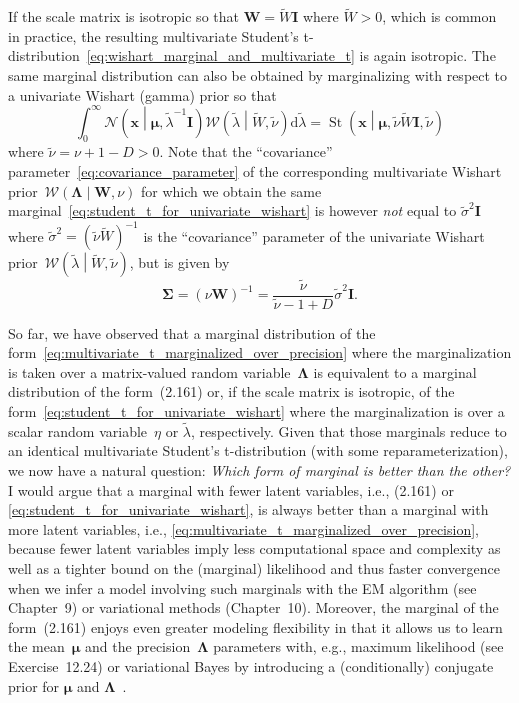 \documentclass[12pt,a4paper]{article}
\begin{document}
If the scale matrix is isotropic so that $\mathbf{W} = \widetilde{W}\mathbf{I}$ where
$\widetilde{W} > 0$,
which is common in practice,
the resulting multivariate Student's t-distribution~\eqref{eq:wishart_marginal_and_multivariate_t}
is again isotropic. The same marginal distribution can also be obtained by marginalizing
with respect to a univariate Wishart (gamma) prior so that
\begin{equation}
\int_{0}^{\infty}
\mathcal{N}\left(\mathbf{x}\middle|\bm{\mu}, \widetilde{\lambda}^{-1}\mathbf{I}\right)
\mathcal{W}\left(\widetilde{\lambda}\middle|\widetilde{W}, \widetilde{\nu}\right)
\mathrm{d}\widetilde{\lambda}
= \operatorname{St}\left(\mathbf{x} \middle|
\bm{\mu}, \widetilde{\nu} \widetilde{W} \mathbf{I}, \widetilde{\nu} \right)
\label{eq:student_t_for_univariate_wishart}
\end{equation}
where $\widetilde{\nu} = \nu + 1 - D > 0$.
Note that the ``covariance'' parameter~\eqref{eq:covariance_parameter} of
the corresponding multivariate
Wishart prior~$\mathcal{W}\left(\bm{\Lambda}\middle|\mathbf{W}, \nu\right)$
for which we obtain the same marginal~\eqref{eq:student_t_for_univariate_wishart}
is however \emph{not} equal to $\widetilde{\sigma}^{2} \mathbf{I}$
where $\widetilde{\sigma}^{2} = \left(\widetilde{\nu}\widetilde{W}\right)^{-1}$ is
the ``covariance'' parameter of the univariate Wishart
prior~$\mathcal{W}\left(\widetilde{\lambda}\middle|\widetilde{W}, \widetilde{\nu}\right)$,
but is given by
\begin{equation}
\bm{\Sigma} = \left(\nu\mathbf{W}\right)^{-1} =
\frac{\widetilde{\nu}}{\widetilde{\nu} - 1 + D} \widetilde{\sigma}^{2} \mathbf{I} .
\end{equation}

So far, we have observed that a marginal
distribution of the form~\eqref{eq:multivariate_t_marginalized_over_precision}
where the marginalization is taken over a matrix-valued random variable~$\bm{\Lambda}$ is
equivalent to a marginal distribution of the form~(2.161) or, if the scale matrix is isotropic,
of the form~\eqref{eq:student_t_for_univariate_wishart} where the marginalization is over
a scalar random variable~$\eta$ or $\widetilde{\lambda}$, respectively.
Given that those marginals reduce to an identical multivariate Student's t-distribution
(with some reparameterization),
we now have a natural question: \emph{Which form of marginal is better than the other?}
I would argue that a marginal with fewer latent variables,
i.e., (2.161) or \eqref{eq:student_t_for_univariate_wishart},
is always better than a marginal with more latent variables,
i.e., \eqref{eq:multivariate_t_marginalized_over_precision},
because fewer latent variables imply less computational space and complexity as well as
a tighter bound on the (marginal) likelihood and thus faster convergence
when we infer a model involving such marginals with the EM algorithm (see Chapter~9) or
variational methods (Chapter~10).
Moreover, the marginal of the form~(2.161) enjoys even greater modeling flexibility in that
it allows us to learn the mean~$\bm{\mu}$ and the precision~$\bm{\Lambda}$ parameters
with, e.g., maximum likelihood (see Exercise~12.24) or
variational Bayes by introducing a (conditionally) conjugate prior for
$\bm{\mu}$ and $\bm{\Lambda}$~\citep{Svensen:RobustMixture}.
\end{document}
